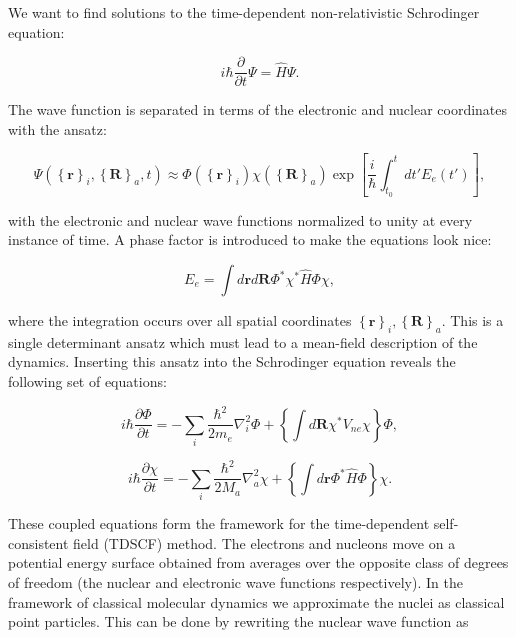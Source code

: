 We want to find solutions to the time-dependent non-relativistic
Schrodinger equation:

\begin{equation}
 i\hbar \frac{\partial}{\partial t} \Psi = \hat{H} \Psi . 
\end{equation}

The wave function is separated in terms of the electronic and nuclear
coordinates with the ansatz:

\begin{equation}
 \Psi \left(\left\{\bm{r}\right\}_i, \left\{\bm{R}\right\}_a, t \right)
    \approx \Phi(\left\{\bm{r}\right\}_i) \chi(\left\{\bm{R}\right\}_a)
    \exp \left[ \frac{i}{\hbar} \int_{t_0}^t
    dt' E_e(t') \right] ,
\end{equation}

with the electronic and nuclear wave functions normalized to unity
at every instance of time. A phase factor is introduced to make
the equations look nice:

\begin{equation}
 E_e = \int d\bm{r} d\bm{R} \Phi^* \chi^* \hat{H} \Phi \chi , 
\end{equation}

where the integration occurs over all spatial coordinates
$\left\{\bm{r}\right\}_i, \left\{\bm{R}\right\}_a$. This is a single determinant
ansatz which must lead to a mean-field description of the dynamics.
Inserting this ansatz into the Schrodinger equation
reveals the following set of equations:

\begin{equation}
 i\hbar \frac{\partial \Phi}{\partial t}
    = -\sum_i \frac{\hbar^2}{2m_e} \nabla_i^2 \Phi
    + \left\{ \int d\bm{R} \chi^* V_{ne} \chi \right\} \Phi , 
\end{equation}

\begin{equation}
 i\hbar \frac{\partial \chi}{\partial t}
    = -\sum_i \frac{\hbar^2}{2M_a} \nabla_a^2 \chi
    + \left\{ \int d\bm{r} \Phi^* \hat{H} \Phi \right\} \chi . 
\end{equation}

These coupled equations form the framework for the
time-dependent self-consistent field (TDSCF) method.
The electrons and nucleons move on a potential energy surface
obtained from averages over the opposite class of
degrees of freedom (the nuclear and electronic wave functions
respectively).
In the framework of classical molecular dynamics
we approximate the nuclei as classical point particles.
This can be done by rewriting the nuclear wave function as

